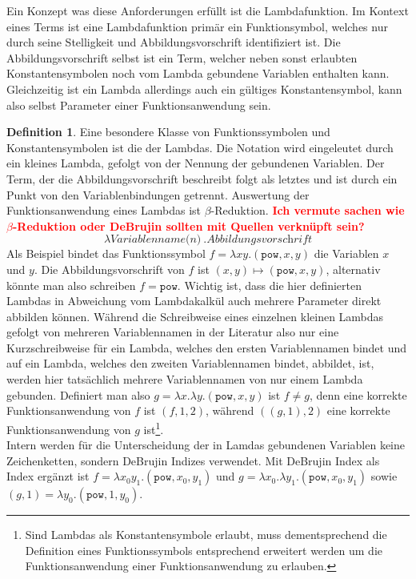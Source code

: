 \documentclass{scrartcl}
\numberwithin{figure}{section} %
\theoremstyle{definition} %
\newcommand{\BFred}[1]{\textbf{\textcolor{red}{#1}}}
\begin{document}
Ein Konzept was diese Anforderungen erfüllt ist die Lambdafunktion. Im Kontext eines Terms ist eine Lambdafunktion primär ein Funktionsymbol, welches nur durch seine Stelligkeit und Abbildungsvorschrift identifiziert ist. Die Abbildungsvorschrift selbst ist ein Term, welcher neben sonst erlaubten Konstantensymbolen noch vom Lambda gebundene Variablen enthalten kann. Gleichzeitig ist ein Lambda allerdings auch ein gültiges Konstantensymbol, kann also selbst Parameter einer Funktionsanwendung sein.


\newtheorem{dLambda}[bsp]{Definition}
\begin{dLambda}
Eine besondere Klasse von Funktionssymbolen und Konstantensymbolen ist die der Lambdas. Die Notation wird eingeleutet durch ein kleines Lambda, gefolgt von der Nennung der gebundenen Variablen. Der Term, der die Abbildungsvorschrift beschreibt folgt als letztes und ist durch ein Punkt von den Variablenbindungen getrennt. Auswertung der Funktionsanwendung eines Lambdas ist $\beta$-Reduktion. \BFred{Ich vermute sachen wie $\beta$-Reduktion oder DeBrujin sollten mit Quellen verknüpft sein?}
$$
\lambda \textit{Variablenname(n)}~.\textit{Abbildungsvorschrift}
$$
Als Beispiel bindet das Funktionssymbol $f = \lambda x y.(\texttt{pow}, x, y)$ die Variablen $x$ und $y$. Die Abbildungsvorschrift von $f$ ist $(x, y) \mapsto (\texttt{pow}, x, y)$, alternativ könnte man also schreiben $f = \texttt{pow}$. Wichtig ist, dass die hier definierten Lambdas in Abweichung vom Lambdakalkül auch mehrere Parameter direkt abbilden können. Während die Schreibweise eines einzelnen kleinen Lambdas gefolgt von mehreren Variablennamen in der Literatur also nur eine Kurzschreibweise für ein Lambda, welches den ersten Variablennamen bindet und auf ein Lambda, welches den zweiten Variablennamen bindet, abbildet, ist, werden hier tatsächlich mehrere Variablennamen von nur einem Lambda gebunden. Definiert man also $g = \lambda x.\lambda y.(\texttt{pow}, x, y)$ ist $f \neq g$, denn eine korrekte Funktionsanwendung von $f$ ist $(f, 1, 2)$, während $((g, 1), 2)$ eine korrekte Funktionsanwendung von $g$ ist\footnote{Sind Lambdas als Konstantensymbole erlaubt, muss dementsprechend die Definition eines Funktionssymbols entsprechend erweitert werden um die Funktionsanwendung einer Funktionsanwendung zu erlauben.}. \\
Intern werden für die Unterscheidung der in Lamdas gebundenen Variablen keine Zeichenketten, sondern DeBrujin Indizes verwendet. Mit DeBrujin Index als Index ergänzt ist $f = \lambda x_0 y_1.(\texttt{pow}, x_0, y_1)$ und $g = \lambda x_0.\lambda y_1.(\texttt{pow}, x_0, y_1)$ sowie $(g, 1) = \lambda y_0.(\texttt{pow}, 1, y_0)$.


\end{dLambda}
\end{document}
